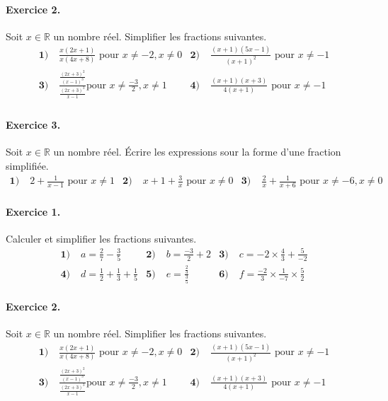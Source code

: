 \documentclass[11pt]{article}
\begin{document}
\paragraph{Exercice 2.} Soit $x\in\mathbb{R}$ un nombre réel. Simplifier 
les fractions suivantes.
\begin{align*}
  \textbf{1)}\;& \frac{x(2x+1)}{x(4x+8)}\text{ pour } x\neq-2, x\neq0 &
  \textbf{2)}\;& \frac{(x+1)(5x-1)}{(x+1)^2}\text{ pour } x\neq-1 \\
  \textbf{3)}\;& \frac{\frac{(2x+3)^2}{(x-1)^3}}{\frac{(2x+3)^3}{x-1}}\text{
  pour } x\neq\frac{-3}{2}, x\neq1 &
  \textbf{4)}\;& \frac{(x+1)(x+3)}{4(x+1)}\text{ pour } x\neq-1 \\
\end{align*}

\paragraph{Exercice 3.} Soit $x\in\mathbb{R}$ un nombre réel. Écrire les
expressions sour la forme d'une fraction simplifiée.
\begin{align*}
  \textbf{1)}\; & 2+\frac{1}{x-1}\text{ pour }x\neq1 &
  \textbf{2)}\; & x+1+\frac{3}{x}\text{ pour }x\neq0 &
  \textbf{3)}\; & \frac{2}{x}+\frac{1}{x+6}\text{ pour }x\neq-6, x\neq0 &
\end{align*}
\paragraph{Exercice 1.} Calculer et simplifier les fractions suivantes.
\begin{align*}
  \textbf{1)}\;& a=\frac{2}{7}-\frac{3}{5} &
  \textbf{2)}\;& b=\frac{-3}{2}+2 &
  \textbf{3)}\;& c=-2\times\frac{4}{3}+\frac{5}{-2} \\
  \textbf{4)}\;& d=\frac{1}{2}+\frac{1}{3}+\frac{1}{5} &
  \textbf{5)}\;& e= \frac{\frac{2}{3}}{\frac{3}{5}} &
  \textbf{6)}\;& f= \frac{-2}{3}\times\frac{1}{-7}\times\frac{5}{2}
\end{align*}

\paragraph{Exercice 2.} Soit $x\in\mathbb{R}$ un nombre réel. Simplifier 
les fractions suivantes.
\begin{align*}
  \textbf{1)}\;& \frac{x(2x+1)}{x(4x+8)}\text{ pour } x\neq-2, x\neq0 &
  \textbf{2)}\;& \frac{(x+1)(5x-1)}{(x+1)^2}\text{ pour } x\neq-1 \\
  \textbf{3)}\;& \frac{\frac{(2x+3)^2}{(x-1)^3}}{\frac{(2x+3)^3}{x-1}}\text{
  pour } x\neq\frac{-3}{2}, x\neq1 &
  \textbf{4)}\;& \frac{(x+1)(x+3)}{4(x+1)}\text{ pour } x\neq-1 \\
\end{align*}
\end{document}
